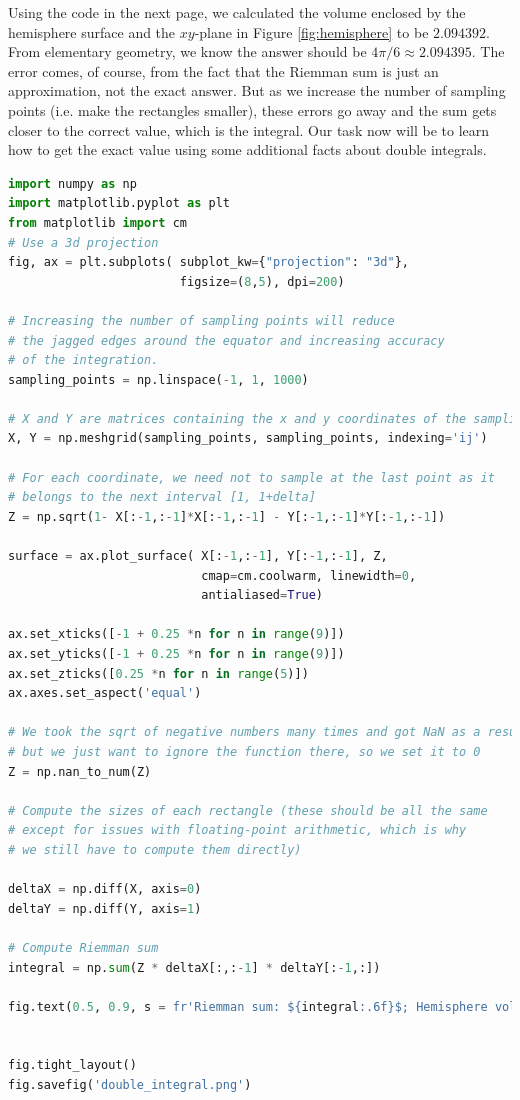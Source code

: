 Using the code in the next page, we calculated the volume enclosed by the hemisphere surface and the $xy$-plane in Figure \ref{fig:hemisphere} to be $2.094392$. From elementary geometry, we know the answer should be $4 \pi /6 \approx 2.094395$. The error comes, of course, from the fact that the Riemman sum is just an approximation, not the exact answer. But as we increase the number of sampling points (i.e. make the rectangles smaller), these errors go away and the sum gets closer to the correct value, which is the integral. Our task now will be to learn how to get the exact value using some additional facts about double integrals.

\pagebreak

\begin{lstlisting}[language=Python]
import numpy as np
import matplotlib.pyplot as plt
from matplotlib import cm
# Use a 3d projection
fig, ax = plt.subplots( subplot_kw={"projection": "3d"}, 
                        figsize=(8,5), dpi=200)

# Increasing the number of sampling points will reduce
# the jagged edges around the equator and increasing accuracy
# of the integration.
sampling_points = np.linspace(-1, 1, 1000)

# X and Y are matrices containing the x and y coordinates of the sampling points
X, Y = np.meshgrid(sampling_points, sampling_points, indexing='ij')

# For each coordinate, we need not to sample at the last point as it
# belongs to the next interval [1, 1+delta]
Z = np.sqrt(1- X[:-1,:-1]*X[:-1,:-1] - Y[:-1,:-1]*Y[:-1,:-1])

surface = ax.plot_surface( X[:-1,:-1], Y[:-1,:-1], Z,
                           cmap=cm.coolwarm, linewidth=0, 
                           antialiased=True)

ax.set_xticks([-1 + 0.25 *n for n in range(9)])
ax.set_yticks([-1 + 0.25 *n for n in range(9)])
ax.set_zticks([0.25 *n for n in range(5)])
ax.axes.set_aspect('equal')

# We took the sqrt of negative numbers many times and got NaN as a result,
# but we just want to ignore the function there, so we set it to 0
Z = np.nan_to_num(Z)

# Compute the sizes of each rectangle (these should be all the same
# except for issues with floating-point arithmetic, which is why
# we still have to compute them directly)

deltaX = np.diff(X, axis=0)
deltaY = np.diff(Y, axis=1)

# Compute Riemman sum
integral = np.sum(Z * deltaX[:,:-1] * deltaY[:-1,:])

fig.text(0.5, 0.9, s = fr'Riemman sum: ${integral:.6f}$; Hemisphere volume: $4\pi / 6 \approx {np.pi * 4/6:.6f}$', size=14, horizontalalignment='center')


fig.tight_layout()
fig.savefig('double_integral.png')
\end{lstlisting}

